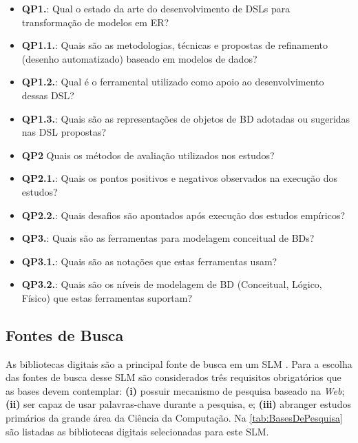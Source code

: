 \begin{itemize}
    \small
    \item \textbf{QP1.}: Qual o estado da arte do desenvolvimento de DSLs para transformação de modelos em ER?
    \item \textbf{QP1.1.}: Quais são as metodologias, técnicas e propostas de refinamento (desenho automatizado) baseado em modelos de dados?
    \item \textbf{QP1.2.}: Qual é o ferramental utilizado como apoio ao desenvolvimento dessas DSL?
    \item \textbf{QP1.3.}: Quais são as representações de objetos de \ac{BD} adotadas ou sugeridas nas DSL propostas?
    \item \textbf{QP2} Quais os métodos de avaliação utilizados nos estudos?
    \item \textbf{QP2.1.}: Quais os pontos positivos e negativos observados na execução dos estudos?
    \item \textbf{QP2.2.}: Quais desafios são apontados após execução dos estudos empíricos?
    \item \textbf{QP3.}: Quais são as ferramentas para modelagem conceitual de \acp{BD}? 
    \item \textbf{QP3.1.}: Quais são as notações que estas ferramentas usam?
    \item \textbf{QP3.2.}: Quais são os níveis de modelagem de \ac{BD} (Conceitual, Lógico, Físico) que estas ferramentas suportam?
\end{itemize}

    \subsection{Fontes de Busca} \label{ssec:FontesBuscas}

As bibliotecas digitais são a principal fonte de busca em um \ac{SLM} \cite{Petersen:2008}. 
Para a escolha das fontes de busca desse \ac{SLM} são considerados três requisitos obrigatórios que as bases devem contemplar: 
\textbf{(i)} possuir mecanismo de pesquisa baseado na \textit{Web}; 
\textbf{(ii)} ser capaz de usar palavras-chave durante a pesquisa, e;
\textbf{(iii)} abranger estudos primários da grande área da Ciência da Computação. 
Na \autoref{tab:BasesDePesquisa} são listadas as bibliotecas digitais selecionadas para este \ac{SLM}.
        
